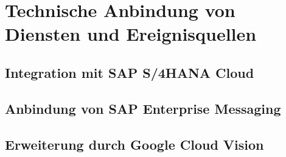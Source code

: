 \section{Technische Anbindung von Diensten und Ereignisquellen}

\subsection{Integration mit SAP S/4HANA Cloud}

\subsection{Anbindung von SAP Enterprise Messaging}

\subsection{Erweiterung durch Google Cloud Vision}